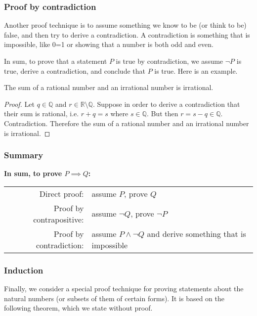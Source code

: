 \documentclass{article}
\begin{document}
\subsubsection{Proof by contradiction}

Another proof technique is to assume something we know to be (or think to be) false, and then try to derive a contradiction. A contradiction is something that is impossible, like 0=1 or showing that a number is both odd and even. 

In sum, to prove that a statement $P$ is true by contradiction, we assume $\neg P$ is true, derive a contradiction, and conclude that $P$ is true. Here is an example.

\begin{example}
The sum of a rational number and an irrational number is irrational.
\end{example}

\begin{proof}
Let $q \in \mathbb{Q}$ and $r \in \mathbb{R} \setminus \mathbb{Q}$.
Suppose in order to derive a contradiction that their sum is rational, i.e. $ r + q = s$ where $s \in \mathbb{Q}$.
But then $r = s - q \in \mathbb{Q}$. Contradiction. Therefore the sum of a rational number and an irrational number is irrational.
\end{proof}




\subsubsection{Summary}

{\bf In sum, to prove $P \implies Q$:} 

\vspace{1em}

\begin{tabular}{r l}
     Direct proof:  & assume $P$, prove $Q$ \\
     Proof by contrapositive:  & assume $\neg Q$, prove $\neg P$ \\ 
     Proof by contradiction: & assume $P \wedge \neg Q$ and derive something that is impossible \\ 
\end{tabular}

\subsubsection{Induction}

Finally, we consider a special proof technique for proving statements about the natural numbers (or subsets of them of certain forms). It is based on the following theorem, which we state without proof. 
\end{document}
